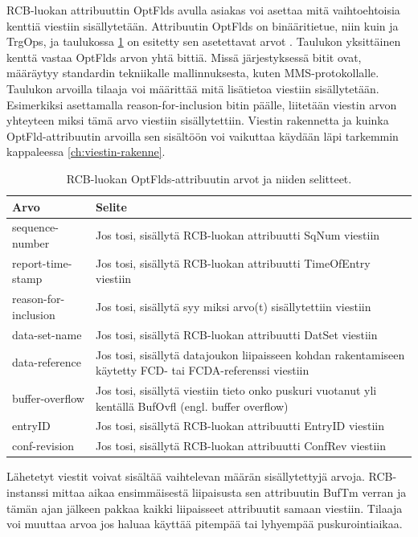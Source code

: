 RCB-luokan attribuuttin OptFlds avulla asiakas voi asettaa mitä vaihtoehtoisia kenttiä viestiin sisällytetään. Attribuutin OptFlds on binääritietue, niin kuin ja TrgOps, ja taulukossa \ref{tab:iec61850-optional-fields-definition} on esitetty sen asetettavat arvot \cite[s.~98]{IEC61850-7-2}. Taulukon yksittäinen kenttä vastaa OptFlds arvon yhtä bittiä. Missä järjestyksessä bitit ovat, määräytyy standardin tekniikalle mallinnuksesta, kuten MMS-protokollalle. Taulukon arvoilla tilaaja voi määrittää mitä lisätietoa viestiin sisällytetään. Esimerkiksi asettamalla reason-for-inclusion bitin päälle, liitetään viestin arvon yhteyteen miksi tämä arvo viestiin sisällytettiin. Viestin rakennetta ja kuinka OptFld-attribuutin arvoilla sen sisältöön voi vaikuttaa käydään läpi tarkemmin kappaleessa \ref{ch:viestin-rakenne}.

\begin{table}[ht!]
	\caption{RCB-luokan OptFlds-attribuutin arvot ja niiden selitteet.}
	\label{tab:iec61850-optional-fields-definition}
	\begin{tabular}{l | l}
		\hline
		\textbf{Arvo} & \textbf{Selite} \\
		\hline \hline
		sequence-number & Jos tosi, sisällytä RCB-luokan attribuutti SqNum viestiin \\
		report-time-stamp & Jos tosi, sisällytä RCB-luokan attribuutti TimeOfEntry viestiin \\
		reason-for-inclusion & Jos tosi, sisällytä syy miksi arvo(t) sisällytettiin viestiin \\
		data-set-name & Jos tosi, sisällytä RCB-luokan attribuutti DatSet viestiin \\
		data-reference & \parbox[t]{10cm}{Jos tosi, sisällytä datajoukon liipaisseen kohdan rakentamiseen käytetty FCD- tai FCDA-referenssi viestiin} \\
		buffer-overflow & \parbox[t]{10cm}{Jos tosi, sisällytä viestiin tieto onko puskuri vuotanut yli kentällä BufOvfl (engl. buffer overflow)} \\
		entryID & Jos tosi, sisällytä RCB-luokan attribuutti EntryID viestiin \\
		conf-revision & Jos tosi, sisällytä RCB-luokan attribuutti ConfRev viestiin \\
		\hline
	\end{tabular}
\end{table}

Lähetetyt viestit voivat sisältää vaihtelevan määrän sisällytettyjä arvoja. RCB-instanssi mittaa aikaa ensimmäisestä liipaisusta sen attribuutin BufTm verran ja tämän ajan jälkeen pakkaa kaikki liipaisseet attribuutit samaan viestiin. Tilaaja voi muuttaa arvoa jos haluaa käyttää pitempää tai lyhyempää puskurointiaikaa.


